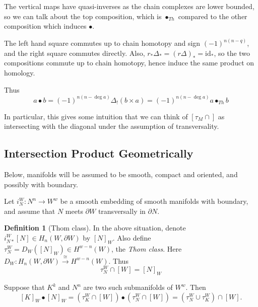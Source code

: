 \documentclass[reqno]{amsart}
\theoremstyle{definition}
\newtheorem{definition}[theorem]{Definition}
\theoremstyle{remark}
\newcommand{\id}{{\mathrm{id}}}
\begin{document}
    The vertical maps have quasi-inverses as the chain complexes are
    lower bounded, so we can talk about the top composition, which
    is $\bullet_{Th}$ compared to the other composition which
    induces $\bullet$.
    
    The left hand square commutes up to
    chain homotopy and sign 
    $(-1)^{n(n-q)}$, and the right square commutes directly.
    Also, $r_* \Delta_* = (r \Delta)_* = \id_*$, so
    the two compositions commute up to chain homotopy, hence
    induce the same product on homology.
    
    Thus
    \[
    a \bullet b = 
    (-1)^{n (n - \deg a)} \Delta_! (b \times a)
    = (-1)^{n (n - \deg a)} a \bullet_{Th} b
    \] 

    In particular, this gives some intuition that we can think of
    $\left[ \tau_M \cap \right] $ as 
    intersecting with the diagonal under the assumption of transversality.





    \newpage







      \subsection{Intersection Product Geometrically}

      Below, manifolds will be assumed to be
      smooth, compact and oriented, and possibly with boundary.

      Let $i_{N}^{W} \colon N^{n} \to W^{w}$ be a smooth
      embedding of smooth manifolds with boundary, and assume
      that $N$ meets $\partial W$ transversally in $\partial N$.

      \begin{definition}[Thom class]
          In the above situation, denote
          $i_{N*}^{W} \left[ N \right] \in 
          H_n (W, \partial W)$ by $\left[ N \right]_W$. Also
          define $\tau_N^{W} = 
          D_W \left( \left[ N \right]_W \right) 
          \in H^{w-n}(W)$, the \textit{Thom class}.
          Here $D_W \colon H_n(W, \partial W) 
          \stackrel{\cong}{\to} H^{w-n}(W)$.
          Thus
          \[
          \tau_N^{W} \cap \left[ W \right] =
          \left[ N \right]_W
          \] 
      \end{definition}




      Suppose that $K^{k}$ and $N^{n}$ are two such submanifolds of
      $W^{w}$. Then
      \[
      \left[ K \right]_W \bullet \left[ N \right]_W = 
      \left( \tau_K^{W} \cap \left[ W \right]  \right) \bullet
      \left( \tau_N^{W} \cap \left[ W \right]  \right) 
      = \left( \tau_N^{W} \cup \tau_K^{W} \right) \cap \left[ W \right] .
      \] 
\end{document}
